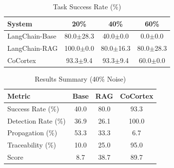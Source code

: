 
\begin{table}[t]
\centering
\caption{Task Success Rate (\%)}
\label{tab:success}
\begin{tabular}{@{}lccc@{}}
\toprule
\textbf{System} & \textbf{20\%} & \textbf{40\%} & \textbf{60\%} \\
\midrule
LangChain-Base & 80.0$\pm$28.3 & 40.0$\pm$0.0 & 0.0$\pm$0.0 \\
LangChain-RAG & 100.0$\pm$0.0 & 80.0$\pm$16.3 & 80.0$\pm$28.3 \\
CoCortex & 93.3$\pm$9.4 & 93.3$\pm$9.4 & 60.0$\pm$0.0 \\
\bottomrule
\end{tabular}
\end{table}

\begin{table}[t]
\centering
\caption{Results Summary (40\% Noise)}
\label{tab:summary}
\begin{tabular}{@{}lccc@{}}
\toprule
\textbf{Metric} & \textbf{Base} & \textbf{RAG} & \textbf{CoCortex} \\
\midrule
Success Rate (\%) & 40.0 & 80.0 & 93.3 \\
Detection Rate (\%) & 36.9 & 26.1 & 100.0 \\
Propagation (\%) & 53.3 & 33.3 & 6.7 \\
Traceability (\%) & 10.0 & 25.0 & 95.0 \\
Score & 8.7 & 38.7 & 89.7 \\
\bottomrule
\end{tabular}
\end{table}
